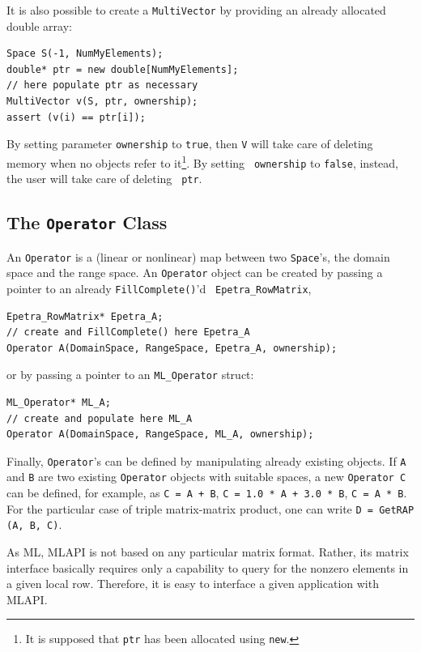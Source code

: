 \documentclass{article}[11pt]
\newcommand{\ML}     {{\sc ML}}
\newcommand{\MLAPI}  {{\sc MLAPI }}
\newcommand{\MLAPIns}  {{\sc MLAPI}}
\begin{document}
\smallskip

It is also possible to create a {\tt MultiVector} by providing an already
allocated double array:
\begin{verbatim}
Space S(-1, NumMyElements);
double* ptr = new double[NumMyElements];
// here populate ptr as necessary
MultiVector v(S, ptr, ownership);
assert (v(i) == ptr[i]);
\end{verbatim} 
By setting parameter {\tt ownership} to {\tt true}, then {\tt V} will take
care of deleting memory when no objects refer to it\footnote{It is supposed
  that {\tt ptr} has been allocated using {\tt new}.}. By setting {\tt
  ownership} to {\tt false}, instead, the user will take care of deleting {\tt
    ptr}.

\subsection{The {\tt Operator} Class}
\label{sec:operator}

An {\tt Operator} is a (linear or nonlinear) map between two {\tt Space}'s, the
domain space and the range space. An {\tt Operator} object can be created
by passing a pointer to an already {\tt FillComplete()}'d {\tt
Epetra\_RowMatrix},
\begin{verbatim}
Epetra_RowMatrix* Epetra_A;
// create and FillComplete() here Epetra_A
Operator A(DomainSpace, RangeSpace, Epetra_A, ownership);
\end{verbatim}
or by passing a pointer to an {\tt ML\_Operator} struct:
\begin{verbatim}
ML_Operator* ML_A;
// create and populate here ML_A
Operator A(DomainSpace, RangeSpace, ML_A, ownership);
\end{verbatim}
Finally, {\tt Operator}'s can be defined 
by manipulating already existing objects. If {\tt A} and {\tt B} are two
existing {\tt Operator} objects with suitable spaces, a new {\tt Operator C}
can be defined, for example, as {\tt C = A
+ B}, {\tt C = 1.0 * A + 3.0 * B}, {\tt C = A * B}. For the particular case of
triple matrix-matrix product, one can write {\tt D = GetRAP (A, B, C)}.
%

As \ML, \MLAPI is not based on any
particular matrix format. Rather, its matrix interface basically requires only
a capability to query for the nonzero elements in a given local row.
Therefore, it is easy to interface a given application with \MLAPIns.
\end{document}
